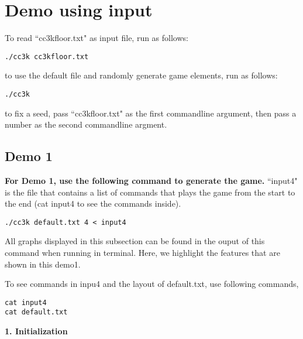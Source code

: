 \documentclass[11pt]{article}
\theoremstyle{plain}
\begin{document}
\newpage
\section{ Demo using input }

To read ``cc3kfloor.txt" as input file, run as follows:
\begin{lstlisting}
./cc3k cc3kfloor.txt
\end{lstlisting}
to use the default file and randomly generate game elements, run as follows:
\begin{lstlisting}
./cc3k
\end{lstlisting}
to fix a seed, pass ``cc3kfloor.txt" as the first commandline argument,
then pass a number as the second commandline argment. 






\newpage
\subsection{Demo 1}
\textbf{For Demo 1, use the following command to generate the game.}
``input4" is the file that contains a list of commands that plays the game from 
the start to the end (cat input4 to see the commands inside).
\begin{lstlisting}
./cc3k default.txt 4 < input4
\end{lstlisting}
All graphs displayed in this subsection can be found in the ouput of
this command when running in terminal. Here, we highlight the features that
are shown in this demo1. 

To see commands in inpu4 and the layout of default.txt, use following commands,
\begin{lstlisting}
cat input4 
cat default.txt
\end{lstlisting}





\vspace{0.5 in}
\textbf{1. Initialization}
\end{document}
